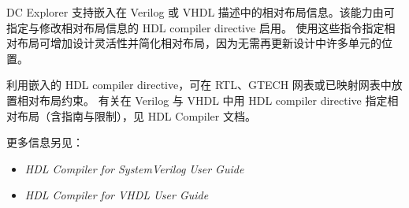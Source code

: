 DC Explorer 支持嵌入在 Verilog 或 VHDL 描述中的相对布局信息。该能力由可指定与修改相对布局信息的 HDL compiler directive 启用。
使用这些指令指定相对布局可增加设计灵活性并简化相对布局，因为无需再更新设计中许多单元的位置。

利用嵌入的 HDL compiler directive，可在 RTL、GTECH 网表或已映射网表中放置相对布局约束。
有关在 Verilog 与 VHDL 中用 HDL compiler directive 指定相对布局（含指南与限制），见 HDL Compiler 文档。

更多信息另见：
\begin{itemize}
  \item \textit{HDL Compiler for SystemVerilog User Guide}
  \item \textit{HDL Compiler for VHDL User Guide}
\end{itemize}
